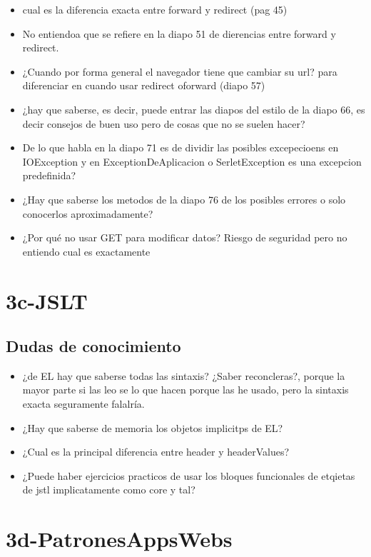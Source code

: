 \begin{itemize}
    \item cual es la diferencia exacta entre forward y redirect (pag 45)
    \item No entiendoa que se refiere en la diapo 51 de dierencias entre forward y redirect.
    \item ¿Cuando por forma general el navegador tiene que cambiar su url? para diferenciar en cuando usar redirect oforward (diapo 57)
    \item ¿hay que saberse, es decir, puede entrar las diapos del estilo de la diapo 66, es decir consejos de buen uso pero de cosas que no se suelen hacer?
    \item De lo que habla en la diapo 71 es de dividir las posibles excepecioens en IOException y en ExceptionDeAplicacion o SerletException es una excepcion predefinida?
    \item ¿Hay que saberse los metodos de la diapo 76 de los posibles errores o solo conocerlos aproximadamente?
    \item ¿Por qué no usar GET para modificar datos? Riesgo de seguridad pero no entiendo cual es exactamente
\end{itemize}

\section*{3c-JSLT}

\subsection*{Dudas de conocimiento}

\begin{itemize}
    \item ¿de EL hay que saberse todas las sintaxis? ¿Saber reconcleras?, porque la mayor parte si las leo se lo que hacen porque las he usado, pero la sintaxis exacta seguramente falalría. 
    \item ¿Hay que saberse de memoria los objetos implicitps de EL?
    \item ¿Cual es la principal diferencia entre header y headerValues?
    \item ¿Puede haber ejercicios practicos de usar los bloques funcionales de etqietas de jstl implicatamente como core y tal?
\end{itemize}

\section*{3d-PatronesAppsWebs}

